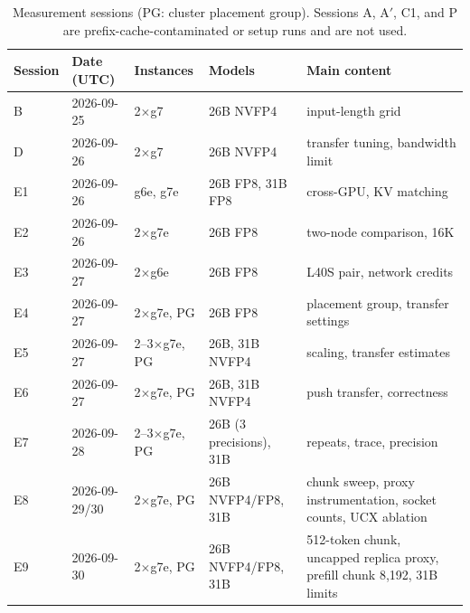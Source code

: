 \documentclass[11pt]{article}
\begin{document}
\begin{table}[H]
\centering\footnotesize
\begin{tabularx}{\linewidth}{llllL}
\toprule
Session & Date (UTC) & Instances & Models & Main content \\
\midrule
B  & 2026-09-25 & 2$\times$g7 & 26B NVFP4 & input-length grid \\
D  & 2026-09-26 & 2$\times$g7 & 26B NVFP4 & transfer tuning, bandwidth limit \\
E1 & 2026-09-26 & g6e, g7e & 26B FP8, 31B FP8 & cross-GPU, KV matching \\
E2 & 2026-09-26 & 2$\times$g7e & 26B FP8 & two-node comparison, 16K \\
E3 & 2026-09-27 & 2$\times$g6e & 26B FP8 & L40S pair, network credits \\
E4 & 2026-09-27 & 2$\times$g7e, PG & 26B FP8 & placement group, transfer settings \\
E5 & 2026-09-27 & 2--3$\times$g7e, PG & 26B, 31B NVFP4 & scaling, transfer estimates \\
E6 & 2026-09-27 & 2$\times$g7e, PG & 26B, 31B NVFP4 & push transfer, correctness \\
E7 & 2026-09-28 & 2--3$\times$g7e, PG & 26B (3 precisions), 31B & repeats, trace, precision \\
E8 & 2026-09-29/30 & 2$\times$g7e, PG & 26B NVFP4/FP8, 31B & chunk sweep, proxy instrumentation, socket counts, UCX ablation \\
E9 & 2026-09-30 & 2$\times$g7e, PG & 26B NVFP4/FP8, 31B & 512-token chunk, uncapped replica proxy, prefill chunk 8,192, 31B limits \\
\bottomrule
\end{tabularx}
\caption{Measurement sessions (PG: cluster placement group). Sessions A, A$'$, C1, and P are prefix-cache-contaminated or setup runs and are not used.}
\label{tab:folders}
\end{table}
\end{document}
